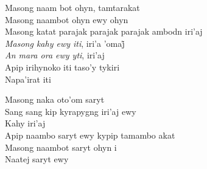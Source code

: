 \begin{linenumbers}\begingroup\raggedright
\noindent Masong naam bot ohyn, tamtarakat\\
Masong naambot ohyn ewy ohyn\\
Masong katat parajak parajak parajak ambodn iri'aj\\
\textit{Masong kahy ewy iti}, iri’a ’omaj̃\\
\textit{An mara ora ewy yti}, iri'aj\\
Apip irihynoko iti taso'y tykiri\\
Napa'irat iti

\end{linenumbers}\endgroup

\bigskip

\begin{linenumbers}\begingroup\raggedright
\noindent Masong naka oto'om saryt\\
Sang sang kip kyrapygng iri'aj ewy\\
Kahy iri'aj\\
Apip naambo saryt ewy kypip tamambo akat\\
Masong naambot saryt ohyn i\\
Naatej saryt ewy

\end{linenumbers}\endgroup

\bigskip

